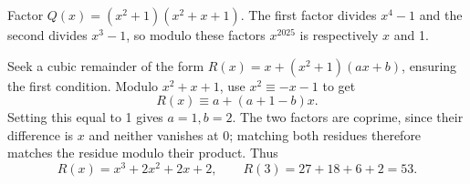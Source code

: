 Factor $Q(x)=(x^2+1)(x^2+x+1)$. The first factor divides $x^4-1$ and the second divides $x^3-1$, so modulo these factors $x^{2025}$ is respectively $x$ and 1.

Seek a cubic remainder of the form $R(x)=x+(x^2+1)(ax+b)$, ensuring the first condition. Modulo $x^2+x+1$, use $x^2\equiv-x-1$ to get
\[R(x)\equiv a+(a+1-b)x.\]
Setting this equal to 1 gives $a=1,b=2$. The two factors are coprime, since their difference is $x$ and neither vanishes at 0; matching both residues therefore matches the residue modulo their product. Thus
\[R(x)=x^3+2x^2+2x+2,\qquad R(3)=27+18+6+2=\boxed{53}.\]
